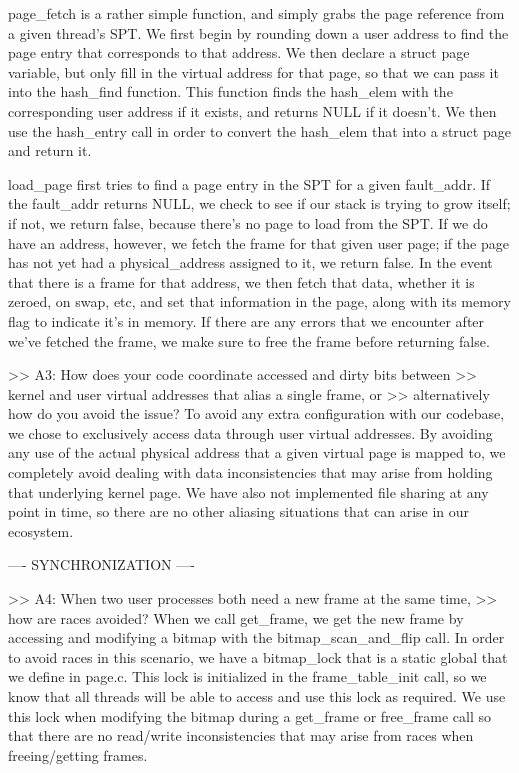 page_fetch is a rather simple function, and simply grabs the page 
reference from a given thread's SPT. We first begin by rounding down a 
user address to find the page entry that corresponds to that address. We
then declare a struct page variable, but only fill in the virtual 
address for that page, so that we can pass it into the hash_find function.
This function finds the hash_elem with the corresponding user address if 
it exists, and returns NULL if it doesn't. We then use the hash_entry call 
in order to convert the hash_elem that into a struct page and return it.

load_page first tries to find a page entry in the SPT for a given 
fault_addr. If the fault_addr returns NULL, we check to see if our stack
is trying to grow itself; if not, we return false, because there's no page
to load from the SPT. If we do have an address, however, we fetch the 
frame for that given user page; if the page has not yet had a 
physical_address assigned to it, we return false. In the event that there 
is a frame for that address, we then fetch that data, whether it is zeroed,
on swap, etc, and set that information in the page, along with its memory 
flag to indicate it's in memory. If there are any errors that we encounter
after we've fetched the frame, we make sure to free the frame before 
returning false.

>> A3: How does your code coordinate accessed and dirty bits between
>> kernel and user virtual addresses that alias a single frame, or
>> alternatively how do you avoid the issue?
To avoid any extra configuration with our codebase, we chose to exclusively 
access data through user virtual addresses. By avoiding any use of the 
actual physical address that a given virtual page is mapped to, we 
completely avoid dealing with data inconsistencies that may arise from 
holding that underlying kernel page. We have also not implemented file 
sharing at any point in time, so there are no other aliasing situations
that can arise in our ecosystem.

---- SYNCHRONIZATION ----

>> A4: When two user processes both need a new frame at the same time,
>> how are races avoided?
When we call get_frame, we get the new frame by accessing and modifying a
bitmap with the bitmap_scan_and_flip call. In order to avoid races in this
scenario, we have a bitmap_lock that is a static global that we define in 
page.c. This lock is initialized in the frame_table_init call, so we know 
that all threads will be able to access and use this lock as required. We 
use this lock when modifying the bitmap during a get_frame or free_frame 
call so that there are no read/write inconsistencies that may arise from 
races when freeing/getting frames.

